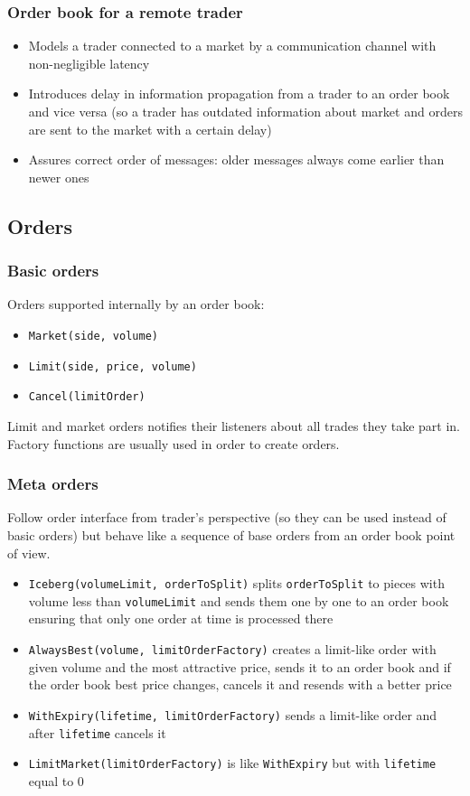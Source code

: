 \documentclass{beamer}
\begin{document}
\begin{frame}
\frametitle{Order book for a remote trader}
\begin{itemize}
  \item Models a trader connected to a market by a communication channel with non-negligible latency
  \item Introduces delay in information propagation from a trader to an order book and vice versa (so a trader has outdated information about market and orders are sent to the market with a certain delay)
  \item Assures correct order of messages: older messages always come earlier than newer ones
\end{itemize}
\end{frame}

\subsection{Orders} 
\begin{frame}
\frametitle{Basic orders}
Orders supported internally by an order book:
\begin{itemize}
  \item \texttt{Market(side, volume)}
  \item \texttt{Limit(side, price, volume)}
  \item \texttt{Cancel(limitOrder)}
\end{itemize}
Limit and market orders notifies their listeners about all trades they take part in.
Factory functions are usually used in order to create orders.
\end{frame}

\begin{frame}
\frametitle{Meta orders}
Follow order interface from trader's perspective (so they can be used instead of basic orders) but behave like a sequence of base orders from an order book point of view.
\begin{itemize}
  \item \texttt{Iceberg(volumeLimit, orderToSplit)} splits \texttt{orderToSplit} to pieces with volume less than \texttt{volumeLimit} and sends them one by one to an order book ensuring that only one order at time is processed there
  \item \texttt{AlwaysBest(volume, limitOrderFactory)} creates a limit-like order with given volume and the most attractive price, sends it to an order book and if the order book best price changes, cancels it and resends with a better price
  \item \texttt{WithExpiry(lifetime, limitOrderFactory)} sends a limit-like order and after \texttt{lifetime} cancels it
  \item \texttt{LimitMarket(limitOrderFactory)} is like \texttt{WithExpiry} but with \texttt{lifetime} equal to 0 
\end{itemize}
\end{frame}
\end{document}
